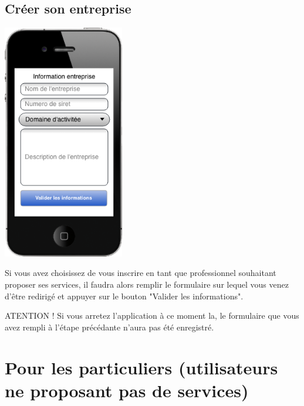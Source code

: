 \documentclass{article}
\begin{document}
\subsection{Créer son entreprise}
\begin{center}
  \includegraphics[width=150pt]{Interfaces/creation_entreprise}
\end{center}
Si vous avez choisissez de vous inscrire en tant que professionnel souhaitant proposer ses services, il faudra alors remplir le formulaire sur lequel vous venez d'être redirigé et appuyer sur le bouton "Valider les informations".

ATENTION ! Si vous arretez l'application à ce moment la, le formulaire que vous avez rempli à l'étape précédante n'aura pas été enregistré.

\section{Pour les particuliers (utilisateurs ne proposant pas de services)}
\end{document}
